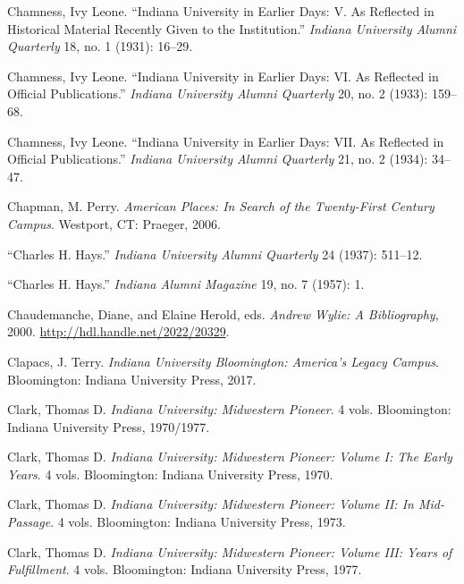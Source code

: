\documentclass[
  american,
  letterpaper,
]{scrreprt}
\newlength{\cslhangindent}
\newenvironment{CSLReferences}[2] %
 {\begin{list}{}{%
  \setlength{\itemindent}{0pt}
  \setlength{\leftmargin}{0pt}
  \setlength{\parsep}{0pt}
  \ifodd #1
   \setlength{\leftmargin}{\cslhangindent}
   \setlength{\itemindent}{-1\cslhangindent}
  \fi
  \setlength{\itemsep}{#2\baselineskip}}}
 {\end{list}}
\begin{document}
\begin{CSLReferences}{1}{0}
Chamness, Ivy Leone. {``Indiana University in Earlier Days: V. As
Reflected in Historical Material Recently Given to the Institution.''}
\emph{Indiana University Alumni Quarterly} 18, no. 1 (1931): 16--29.

Chamness, Ivy Leone. {``Indiana University in Earlier Days: VI. As
Reflected in Official Publications.''} \emph{Indiana University Alumni
Quarterly} 20, no. 2 (1933): 159--68.

Chamness, Ivy Leone. {``Indiana University in Earlier Days: VII. As
Reflected in Official Publications.''} \emph{Indiana University Alumni
Quarterly} 21, no. 2 (1934): 34--47.

Chapman, M. Perry. \emph{American Places: In Search of the Twenty-First
Century Campus}. Westport, CT: Praeger, 2006.

{``{Charles H. Hays}.''} \emph{Indiana University Alumni Quarterly} 24
(1937): 511--12.

{``{Charles H. Hays}.''} \emph{Indiana Alumni Magazine} 19, no. 7
(1957): 1.

Chaudemanche, Diane, and Elaine Herold, eds. \emph{Andrew Wylie: A
Bibliography}, 2000. \url{http://hdl.handle.net/2022/20329}.

Clapacs, J. Terry. \emph{Indiana University Bloomington: America's
Legacy Campus}. Bloomington: Indiana University Press, 2017.

Clark, Thomas D. \emph{Indiana University: Midwestern Pioneer}. 4 vols.
Bloomington: Indiana University Press, 1970/1977.

Clark, Thomas D. \emph{Indiana University: Midwestern Pioneer: Volume
{I}: The Early Years}. 4 vols. Bloomington: Indiana University Press,
1970.

Clark, Thomas D. \emph{Indiana University: Midwestern Pioneer: Volume
{II}: In Mid-Passage}. 4 vols. Bloomington: Indiana University Press,
1973.

Clark, Thomas D. \emph{Indiana University: Midwestern Pioneer: Volume
{III}: Years of Fulfillment}. 4 vols. Bloomington: Indiana University
Press, 1977.


\end{CSLReferences}
\end{document}
